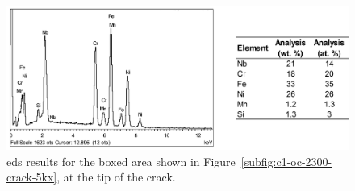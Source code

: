 {\begin{figure}
    \centering
    \includegraphics[width=\textwidth]{figures/metallography/c1-oc-2300-crack-tip-particles-eds-table.png}
    \caption{\Gls{eds} results for the boxed area shown in Figure~\ref{subfig:c1-oc-2300-crack-5kx}, at the tip of the crack.}
    \label{fig:c1-oc-2300-crack-tip-particles-eds}
\end{figure}


}
